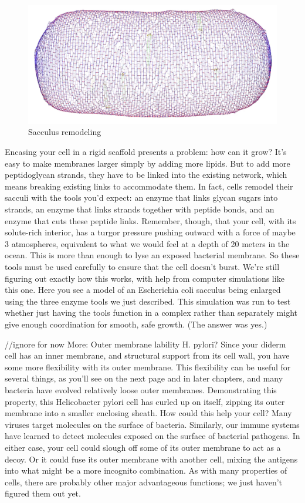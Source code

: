\documentclass[]{tufte-book}
\begin{document}
\begin{figure}
\includegraphics{img/02_schematic/2_3_2_SacculusRemodeling} \caption[Sacculus remodeling]{Sacculus remodeling}\label{fig:2-3-2}
\end{figure}

Encasing your cell in a rigid scaffold presents a problem: how can it
grow? It's easy to make membranes larger simply by adding more lipids.
But to add more peptidoglycan strands, they have to be linked into the
existing network, which means breaking existing links to accommodate
them. In fact, cells remodel their sacculi with the tools you'd expect:
an enzyme that links glycan sugars into strands, an enzyme that links
strands together with peptide bonds, and an enzyme that cuts these
peptide links. Remember, though, that your cell, with its solute-rich
interior, has a turgor pressure pushing outward with a force of maybe 3
atmospheres, equivalent to what we would feel at a depth of 20 meters in
the ocean. This is more than enough to lyse an exposed bacterial
membrane. So these tools must be used carefully to ensure that the cell
doesn't burst. We're still figuring out exactly how this works, with
help from computer simulations like this one. Here you see a model of an
Escherichia coli sacculus being enlarged using the three enzyme tools we
just described. This simulation was run to test whether just having the
tools function in a complex rather than separately might give enough
coordination for smooth, safe growth. (The answer was yes.)

//ignore for now More: Outer membrane lability H. pylori? Since your
diderm cell has an inner membrane, and structural support from its cell
wall, you have some more flexibility with its outer membrane. This
flexibility can be useful for several things, as you'll see on the next
page and in later chapters, and many bacteria have evolved relatively
loose outer membranes. Demonstrating this property, this Helicobacter
pylori cell has curled up on itself, zipping its outer membrane into a
smaller enclosing sheath. How could this help your cell? Many viruses
target molecules on the surface of bacteria. Similarly, our immune
systems have learned to detect molecules exposed on the surface of
bacterial pathogens. In either case, your cell could slough off some of
its outer membrane to act as a decoy. Or it could fuse its outer
membrane with another cell, mixing the antigens into what might be a
more incognito combination. As with many properties of cells, there are
probably other major advantageous functions; we just haven't figured
them out yet.
\end{document}
